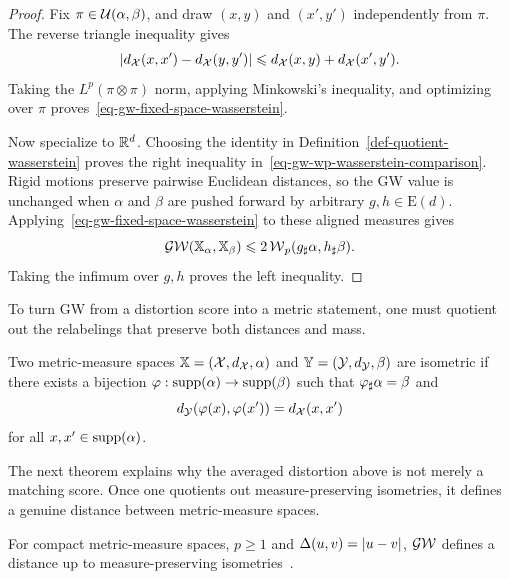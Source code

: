 \begin{proof}
	Fix $\pi\in\mathcal{U}(\alpha,\beta)$, and draw $(x,y)$ and $(x',y')$ independently from $\pi$. The reverse triangle inequality gives
	\[
		\left\lvert d_{\mathcal{X}}(x,x')-d_{\mathcal{X}}(y,y')\right\rvert
		\leqslant
		d_{\mathcal{X}}(x,y)+d_{\mathcal{X}}(x',y').
	\]
	Taking the $L^p(\pi\otimes\pi)$ norm, applying Minkowski's inequality, and optimizing over $\pi$ proves~\eqref{eq-gw-fixed-space-wasserstein}.

	Now specialize to $\mathbb{R}^d$. Choosing the identity in Definition~\ref{def-quotient-wasserstein} proves the right inequality in~\eqref{eq-gw-wp-wasserstein-comparison}. Rigid motions preserve pairwise Euclidean distances, so the GW value is unchanged when $\alpha$ and $\beta$ are pushed forward by arbitrary $g,h\in\mathrm E(d)$. Applying~\eqref{eq-gw-fixed-space-wasserstein} to these aligned measures gives
	\[
		\operatorname{\mathcal{GW}}(\mathbb{X}_\alpha,\mathbb{X}_\beta)
		\leqslant
		2\operatorname{\mathcal{W}}_p(g_\sharp\alpha,h_\sharp\beta).
	\]
	Taking the infimum over $g,h$ proves the left inequality.
\end{proof}

To turn GW from a distortion score into a metric statement, one must quotient out the relabelings that preserve both distances and mass.

\begin{defn}\label{def-isometric-mm-spaces}
	Two metric-measure spaces $\mathbb{X}=(\mathcal{X},d_{\mathcal{X}},\alpha)$ and $\mathbb{Y}=(\mathcal{Y},d_{\mathcal{Y}},\beta)$ are isometric if there exists a bijection $\varphi:\operatorname{supp}(\alpha)\to\operatorname{supp}(\beta)$ such that $\varphi_\sharp\alpha=\beta$ and
	\[
		d_{\mathcal{Y}}(\varphi(x),\varphi(x'))=d_{\mathcal{X}}(x,x')
	\]
	for all $x,x'\in\operatorname{supp}(\alpha)$.
\end{defn}

The next theorem explains why the averaged distortion above is not merely a matching score. Once one quotients out measure-preserving isometries, it defines a genuine distance between metric-measure spaces.

\begin{thm}\label{thm-gw-metric}
	For compact metric-measure spaces, $p\geq1$ and $\Delta(u,v)=|u-v|$, $\operatorname{\mathcal{GW}}$ defines a distance up to measure-preserving isometries~\cite{memoli-2011}.
\end{thm}

